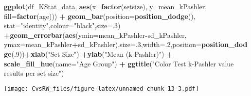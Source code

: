 \documentclass[
]{article}
\newenvironment{Shaded}{\begin{snugshade}}{\end{snugshade}}
\newcommand{\DataTypeTok}[1]{\textcolor[rgb]{0.13,0.29,0.53}{#1}}
\newcommand{\DecValTok}[1]{\textcolor[rgb]{0.00,0.00,0.81}{#1}}
\newcommand{\KeywordTok}[1]{\textcolor[rgb]{0.13,0.29,0.53}{\textbf{#1}}}
\newcommand{\NormalTok}[1]{#1}
\newcommand{\OperatorTok}[1]{\textcolor[rgb]{0.81,0.36,0.00}{\textbf{#1}}}
\newcommand{\StringTok}[1]{\textcolor[rgb]{0.31,0.60,0.02}{#1}}
\begin{document}
\begin{Shaded}
\begin{Highlighting}[]
\KeywordTok{ggplot}\NormalTok{(df_KStat_data, }\KeywordTok{aes}\NormalTok{(}\DataTypeTok{x=}\KeywordTok{factor}\NormalTok{(setsize), }\DataTypeTok{y=}\NormalTok{mean_kPashler, }\DataTypeTok{fill=}\KeywordTok{factor}\NormalTok{(age))) }\OperatorTok{+}\StringTok{ }\KeywordTok{geom_bar}\NormalTok{(}\DataTypeTok{position=}\KeywordTok{position_dodge}\NormalTok{(), }\DataTypeTok{stat=}\StringTok{"identity"}\NormalTok{,}\DataTypeTok{colour=}\StringTok{"black"}\NormalTok{,}\DataTypeTok{size=}\NormalTok{.}\DecValTok{3}\NormalTok{) }\OperatorTok{+}\KeywordTok{geom_errorbar}\NormalTok{(}\KeywordTok{aes}\NormalTok{(}\DataTypeTok{ymin=}\NormalTok{mean_kPashler}\OperatorTok{-}\NormalTok{sd_kPashler, }\DataTypeTok{ymax=}\NormalTok{mean_kPashler}\OperatorTok{+}\NormalTok{sd_kPashler),}\DataTypeTok{size=}\NormalTok{.}\DecValTok{3}\NormalTok{,}\DataTypeTok{width=}\NormalTok{.}\DecValTok{2}\NormalTok{,}\DataTypeTok{position=}\KeywordTok{position_dodge}\NormalTok{(.}\DecValTok{9}\NormalTok{))}\OperatorTok{+}\KeywordTok{xlab}\NormalTok{(}\StringTok{"Set Size"}\NormalTok{) }\OperatorTok{+}\KeywordTok{ylab}\NormalTok{(}\StringTok{"Mean (k-Pashler)"}\NormalTok{) }\OperatorTok{+}\StringTok{ }\KeywordTok{scale_fill_hue}\NormalTok{(}\DataTypeTok{name=}\StringTok{"Age Group"}\NormalTok{) }\OperatorTok{+}\StringTok{ }\KeywordTok{ggtitle}\NormalTok{(}\StringTok{"Color Test k-Pashler value results per set size"}\NormalTok{)}
\end{Highlighting}
\end{Shaded}

\texttt{[image: CvsRW\_files/figure-latex/unnamed-chunk-13-3.pdf]}
\end{document}
